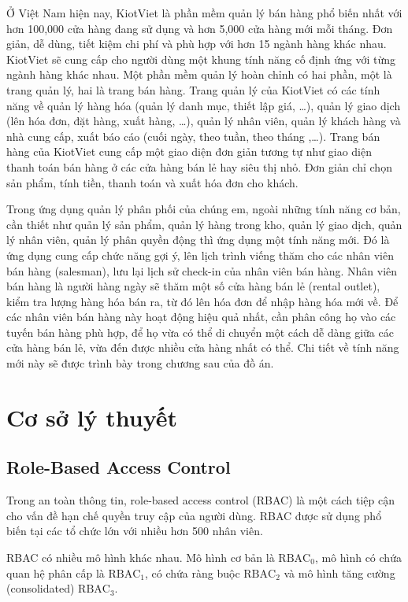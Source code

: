 Ở Việt Nam hiện nay, KiotViet là phần mềm quản lý bán hàng phổ biến
nhất với hơn 100,000 cửa hàng đang sử dụng và hơn 5,000 cửa hàng mới
mỗi tháng. Đơn giản, dễ dùng, tiết kiệm chi phí và phù hợp với hơn
15 ngành hàng khác nhau. KiotViet sẽ cung cấp cho người dùng một khung
tính năng cố định ứng với từng ngành hàng khác nhau. Một phần mềm
quản lý hoàn chỉnh có hai phần, một là trang quản lý, hai là trang
bán hàng. Trang quản lý của KiotViet có các tính năng về quản lý hàng
hóa (quản lý danh mục, thiết lập giá, …), quản lý giao dịch (lên hóa đơn,
đặt hàng, xuất hàng, …), quản lý nhân viên, quản lý khách hàng và
nhà cung cấp, xuất báo cáo (cuối ngày, theo tuần, theo tháng ,…).
Trang bán hàng của KiotViet cung cấp một giao diện đơn giản tương tự
như giao diện thanh toán bán hàng ở các cửa hàng bán lẻ hay
siêu thị nhỏ. Đơn giản chỉ chọn sản phẩm, tính tiền, thanh toán
và xuất hóa đơn cho khách.

Trong ứng dụng quản lý phân phối của chúng em, ngoài những tính
năng cơ bản, cần thiết như quản lý sản phẩm, quản lý hàng trong kho,
quản lý giao dịch, quản lý nhân viên, quản lý phân quyền động thì ứng
dụng một tính năng mới. Đó là ứng dụng cung cấp chức năng gợi ý,
lên lịch trình viếng thăm cho các nhân viên bán hàng (salesman), lưu
lại lịch sử check-in của nhân viên bán hàng. Nhân viên bán hàng
là người hàng ngày sẽ thăm một số cửa hàng bán lẻ (rental outlet),
kiểm tra lượng hàng hóa bán ra, từ đó lên hóa đơn để nhập hàng hóa
mới về. Để các nhân viên bán hàng này hoạt động hiệu quả nhất, cần
phân công họ vào các tuyến bán hàng phù hợp, để họ vừa có thể di chuyển
một cách dễ dàng giữa các cửa hàng bán lẻ, vừa đến được nhiều cửa
hàng nhất có thể. Chi tiết về tính năng mới này sẽ được trình bày
trong chương sau của đồ án.

\section{Cơ sở lý thuyết}
\subsection{Role-Based Access Control}
Trong an toàn thông tin, role-based access control (RBAC) là
một cách tiệp cận cho vấn đề hạn chế quyền truy cập của
người dùng. RBAC được sử dụng phổ biến tại các tổ chức
lớn với nhiều hơn 500 nhân viên. 

RBAC có nhiều mô hình khác nhau. Mô hình cơ bản là
$\text{RBAC}_0$, mô hình có chứa quan hệ phân cấp là
$\text{RBAC}_1$, có chứa ràng buộc $\text{RBAC}_2$ và mô hình tăng
cường (consolidated) $\text{RBAC}_3$.


